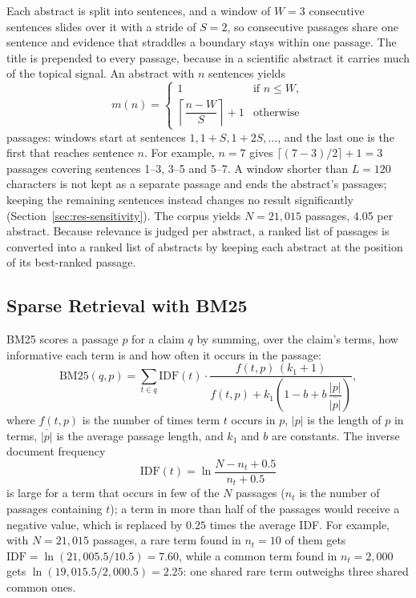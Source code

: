 Each abstract is split into sentences, and a window of $W = 3$ consecutive sentences slides
over it with a stride of $S = 2$, so consecutive passages share one sentence and evidence that
straddles a boundary stays within one passage. The title is prepended to every passage,
because in a scientific abstract it carries much of the topical signal. An abstract with $n$
sentences yields
\begin{equation}
m(n) =
\begin{cases}
1 & \text{if } n \le W,\\[2pt]
\left\lceil \dfrac{n - W}{S} \right\rceil + 1 & \text{otherwise}
\end{cases}
\label{eq:npassages}
\end{equation}
passages: windows start at sentences $1, 1+S, 1+2S, \dots$, and the last one is the first that
reaches sentence $n$. For example, $n = 7$ gives $\lceil (7-3)/2 \rceil + 1 = 3$ passages
covering sentences 1--3, 3--5 and 5--7. A window shorter than $L = 120$ characters is not kept
as a separate passage and ends the abstract's passages; keeping the remaining sentences instead
changes no result significantly (Section~\ref{sec:res-sensitivity}). The corpus yields
$N = 21{,}015$ passages, 4.05 per abstract. Because relevance is judged per abstract, a ranked
list of passages is converted into a ranked list of abstracts by keeping each abstract at the
position of its best-ranked passage.

\subsection{Sparse Retrieval with BM25}
\label{sec:bm25}

BM25 \parencite{robertson2009bm25} scores a passage $p$ for a claim $q$ by summing, over the
claim's terms, how informative each term is and how often it occurs in the passage:
\begin{equation}
\mathrm{BM25}(q, p) = \sum_{t \in q} \mathrm{IDF}(t) \cdot
\frac{f(t,p)\,(k_1 + 1)}{f(t,p) + k_1\left(1 - b + b\,\dfrac{|p|}{\overline{|p|}}\right)},
\label{eq:bm25}
\end{equation}
where $f(t,p)$ is the number of times term $t$ occurs in $p$, $|p|$ is the length of $p$ in
terms, $\overline{|p|}$ is the average passage length, and $k_1$ and $b$ are constants. The
inverse document frequency
\begin{equation}
\mathrm{IDF}(t) = \ln \frac{N - n_t + 0.5}{n_t + 0.5}
\label{eq:idf}
\end{equation}
is large for a term that occurs in few of the $N$ passages ($n_t$ is the number of passages
containing $t$); a term in more than half of the passages would receive a negative value, which
is replaced by $0.25$ times the average IDF. For example, with $N = 21{,}015$ passages, a rare
term found in $n_t = 10$ of them gets $\mathrm{IDF} = \ln(21{,}005.5 / 10.5) = 7.60$, while a
common term found in $n_t = 2{,}000$ gets $\ln(19{,}015.5 / 2{,}000.5) = 2.25$: one shared rare
term outweighs three shared common ones.

